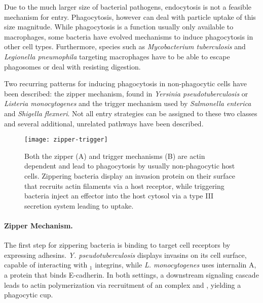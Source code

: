 Due to the much larger size of bacterial pathogens, endocytosis is not a feasible mechanism for entry. Phagocytosis, however can deal with particle uptake of this size magnitude. While phagocytosis is a function usually only available to macrophages, some bacteria have evolved mechanisms to induce phagocytosis in other cell types. Furthermore, species such as \textit{Mycobacterium tuberculosis} and \textit{Legionella pneumophila} targeting macrophages have to be able to escape phagosomes or deal with resisting digestion.

Two recurring patterns for inducing phagocytosis in non-phagocytic cells have been described: the zipper mechanism, found in \textit{Yersinia pseudotuberculosis} or \textit{Listeria monocytogenes} and the trigger mechanism used by \textit{Salmonella enterica} and \textit{Shigella flexneri}. Not all entry strategies can be assigned to these two classes and several additional, unrelated pathways have been described.

\begin{figure}
  \centering
  \texttt{[image: zipper-trigger]}
  \caption[Zipper and trigger mechanisms for bacterial host-cell entry]{Both the zipper (A) and trigger mechanisms (B) are actin dependent and lead to phagocytosis by usually non-phagocytic host cells. Zippering bacteria display an invasion protein on their surface that recruits actin filaments via a host receptor, while triggering bacteria inject an effector into the host cytosol via a type III secretion system leading to uptake. \citep{Haglund2011}}
  \label{fig:zipper-trigger}
\end{figure}


\paragraph{Zipper Mechanism.}
The first step for zippering bacteria is binding to target cell receptors by expressing adhesins. \textit{Y. pseudotuberculosis} displays invasins on its cell surface, capable of interacting with \textbeta$_1$ integrins, while \textit{L. monocytogenes} uses internalin A, a protein that binds E-cadherin. In both settings, a downstream signaling cascade leads to actin polymerization via recruitment of an  complex and , yielding a phagocytic cup.

